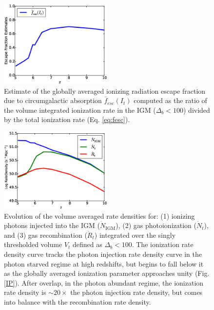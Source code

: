 \begin{figure}
	\includegraphics[width=0.5\textwidth]{EscFraction.eps}
	\caption{Estimate of the globally averaged ionizing radiation escape fraction due to circumgalactic absorption $\bar{f}_{esc}(I_t)$ computed as the ratio of the volume integrated ionization rate in the IGM ($\Delta_b < 100$) divided by the total ionization rate (Eq. \eqref{eq:fesc}). }
	\label{EscFraction}
\end{figure}

\begin{figure}
	\includegraphics[width=0.5\textwidth]{sanity_check_ratedensity.eps}
	\caption{Evolution of the volume averaged rate densities for: (1) ionizing photons injected into the IGM ($\dot{N}_\mathrm{IGM}$), (2) gas photoionization ($\dot{N}_t$), and (3) gas recombination  ($\dot{R}_t$) integrated over the singly thresholded volume $V_t$ defined as $\Delta_b<100$. The ionization rate density curve tracks the photon injection rate density curve in the photon starved regime at high redshifts, but begins to fall below it as the globally averaged ionization parameter approaches unity (Fig. \ref{IP}). After overlap, in the photon abundant regime, the ionization rate density is $\sim 20\times$ the photon injection rate density, but comes into balance with the recombination rate density.}
	\label{sanitycheckrate}
\end{figure}

